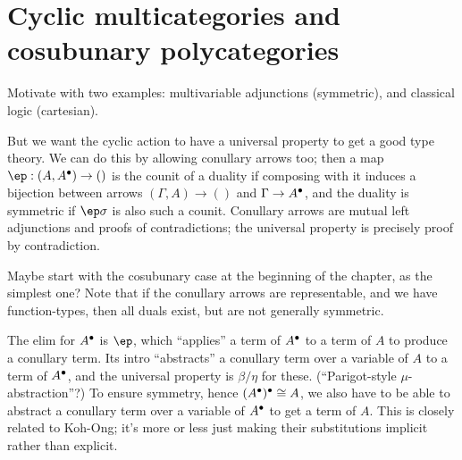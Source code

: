 \begin{props}

\end{props}

\section{Cyclic multicategories and cosubunary polycategories}
\label{sec:cycmulti}

Motivate with two examples: multivariable adjunctions (symmetric), and classical logic (cartesian).

But we want the cyclic action to have a universal property to get a good type theory.
We can do this by allowing conullary arrows too; then a map $\ep : (A,A\d) \to ()$ is the counit of a duality if composing with it induces a bijection between arrows $(\Gamma,A)\to ()$ and $\Gamma \to A^\bullet$, and the duality is symmetric if $\ep\si$ is also such a counit.
Conullary arrows are mutual left adjunctions and proofs of contradictions; the universal property is precisely proof by contradiction.

Maybe start with the cosubunary case at the beginning of the chapter, as the simplest one?
Note that if the conullary arrows are representable, and we have function-types, then all duals exist, but are not generally symmetric.

The elim for $A^\bullet$ is $\ep$, which ``applies'' a term of $A^\bullet$ to a term of $A$ to produce a conullary term.
Its intro ``abstracts'' a conullary term over a variable of $A$ to a term of $A^\bullet$, and the universal property is $\beta/\eta$ for these.
(``Parigot-style $\mu$-abstraction''?)
To ensure symmetry, hence $(A^\bullet)^\bullet\cong A$, we also have to be able to abstract a conullary term over a variable of $A^\bullet$ to get a term of $A$.
This is closely related to Koh-Ong; it's more or less just making their substitutions implicit rather than explicit.

